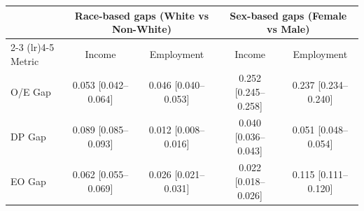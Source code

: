 \setlength{\tabcolsep}{4pt}
\renewcommand{\arraystretch}{1.08}
\begin{tabular*}{\textwidth}{@{\extracolsep{\fill}}lcccc}
\toprule
 & \multicolumn{2}{c}{Race-based gaps (White vs Non-White)} & \multicolumn{2}{c}{Sex-based gaps (Female vs Male)} \\
\cmidrule(lr){2-3} \cmidrule(lr){4-5}
Metric & Income & Employment & Income & Employment \\
\midrule
O/E Gap & 0.053 [0.042--0.064] & 0.046 [0.040--0.053] & 0.252 [0.245--0.258] & 0.237 [0.234--0.240] \\
DP Gap & 0.089 [0.085--0.093] & 0.012 [0.008--0.016] & 0.040 [0.036--0.043] & 0.051 [0.048--0.054] \\
EO Gap & 0.062 [0.055--0.069] & 0.026 [0.021--0.031] & 0.022 [0.018--0.026] & 0.115 [0.111--0.120] \\
\bottomrule
\end{tabular*}
